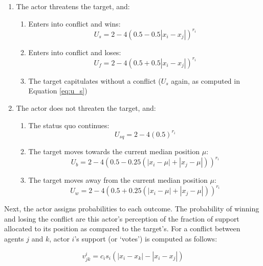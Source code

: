 \begin{enumerate}
    \item The actor threatens the target, and:

        \begin{enumerate}
        \item Enters into conflict and wins: 
            \begin{equation}
            U_s = 2 - 4(0.5 - 0.5|x_i - x_j|)^{r_i} \label{eq:u_s}
            \end{equation}
        \item Enters into conflict and loses:
            \begin{equation}
            U_f = 2 - 4(0.5 + 0.5|x_i - x_j|)^{r_i}
            \end{equation}
        \item The target capitulates without a conflict ($U_s$ again, as computed in Equation \ref{eq:u_s})
        \end{enumerate}
    \item The actor does not threaten the target, and:
        \begin{enumerate}
        \item The status quo continues:
            \begin{equation}
            U_{sq} = 2 - 4(0.5)^{r_i}
            \end{equation}
        \item The target moves towards the current median position $\mu$:
        \begin{equation}
            U_b = 2 - 4(0.5 - 0.25(|x_i-\mu|+|x_j-\mu|))^{r_i}
            \end{equation}
        \item The target moves away from the current median position $\mu$:
        \begin{equation}
            U_w = 2 - 4(0.5 + 0.25(|x_i-\mu|+|x_j-\mu|))^{r_i} \label{eq:u_w}
            \end{equation}
        \end{enumerate}
\end{enumerate}

Next, the actor assigns probabilities to each outcome. The probability of winning and losing the conflict are this actor's perception of the fraction of support allocated to its position as compared to the target's. For a conflict between agents $j$ and $k$, actor $i$'s support (or `votes') is computed as follows:

\begin{equation}
    v^{i}_{jk} = c_is_i (|x_i-x_k| - |x_i-x_j|) \label{eq:votes}
\end{equation}

